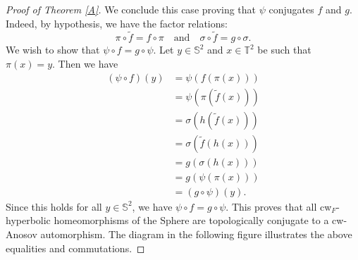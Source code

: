 \documentclass{amsart}
\theoremstyle{plain}
\theoremstyle{definition}
\begin{document}
\begin{proof}[Proof of Theorem \ref{A}]
We conclude this case proving that $\psi$ conjugates $f$ and $g$. Indeed,
by hypothesis, we have the factor relations:
\begin{equation}
\pi \circ\tilde f = f \circ \pi \quad \text{and} \quad \sigma \circ\tilde f = g \circ \sigma.
\end{equation}
We wish to show that $\psi \circ f = g \circ \psi$. Let $y \in \mathbb{S}^2$ and $x \in\mathbb{T}^2$ be such that $\pi(x) = y$. Then we have
\begin{align*}
(\psi \circ f)(y) &= \psi(f(\pi(x))) \\
&= \psi(\pi(\tilde f(x))) \tag{by factor property of $f$} \\
&= \sigma(h(\tilde f(x))) \tag{since $\psi \circ \pi = \sigma\circ h$} \\
&= \sigma(\tilde f(h(x))) \tag{since $h\circ\tilde f=\tilde f\circ h$} \\
&= g(\sigma(h(x))) \tag{by factor property of $g$} \\
&= g(\psi(\pi(x))) \tag{since $\sigma\circ h = \psi \circ \pi$} \\
&= (g \circ \psi)(y).
\end{align*}
Since this holds for all $y \in\mathbb{S}^2$, we have $\psi \circ f = g \circ \psi$. This proves that all cw$_F$-hyperbolic homeomorphisms of the Sphere are topologically conjugate to a cw-Anosov automorphism. The diagram in the following figure illustrates the above equalities and commutations.


\end{proof}
\end{document}
